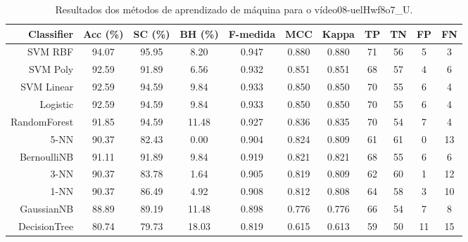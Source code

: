 \begin{table}[!htb]
\centering
\caption{Resultados dos métodos de aprendizado de máquina para o vídeo08-uelHwf8o7_U.}
\label{tab:08-uelHwf8o7_U}
\begin{tabular}{r|c|c|c|c|c|c|c|c|c|c}
\hline\hline
Classifier & Acc (\%) & SC (\%) & BH (\%) & F-medida & MCC & Kappa & TP & TN & FP & FN \\ \hline
SVM RBF & 94.07 & 95.95 & 8.20 & 0.947 & 0.880 & 0.880 & 71 & 56 & 5 & 3 \\ 
SVM Poly & 92.59 & 91.89 & 6.56 & 0.932 & 0.851 & 0.851 & 68 & 57 & 4 & 6 \\ 
SVM Linear & 92.59 & 94.59 & 9.84 & 0.933 & 0.850 & 0.850 & 70 & 55 & 6 & 4 \\ 
Logistic & 92.59 & 94.59 & 9.84 & 0.933 & 0.850 & 0.850 & 70 & 55 & 6 & 4 \\ 
RandomForest & 91.85 & 94.59 & 11.48 & 0.927 & 0.836 & 0.835 & 70 & 54 & 7 & 4 \\ 
5-NN & 90.37 & 82.43 & 0.00 & 0.904 & 0.824 & 0.809 & 61 & 61 & 0 & 13 \\ 
BernoulliNB & 91.11 & 91.89 & 9.84 & 0.919 & 0.821 & 0.821 & 68 & 55 & 6 & 6 \\ 
3-NN & 90.37 & 83.78 & 1.64 & 0.905 & 0.819 & 0.809 & 62 & 60 & 1 & 12 \\ 
1-NN & 90.37 & 86.49 & 4.92 & 0.908 & 0.812 & 0.808 & 64 & 58 & 3 & 10 \\ 
GaussianNB & 88.89 & 89.19 & 11.48 & 0.898 & 0.776 & 0.776 & 66 & 54 & 7 & 8 \\ 
DecisionTree & 80.74 & 79.73 & 18.03 & 0.819 & 0.615 & 0.613 & 59 & 50 & 11 & 15 \\ 
\hline\hline
\end{tabular}
\end{table}

